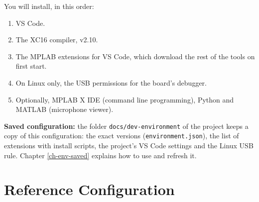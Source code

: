 \documentclass[
  11pt,
  letterpaper,
  oneside,
  DIV=13,               %
  parskip=half,          %
  headings=normal,
  chapterprefix=false,
  toc=listof,
  numbers=noenddot,
]{scrbook}
\begin{document}
You will install, in this order:
\begin{enumerate}
\item VS Code.
\item The XC16 compiler, v2.10.
\item The MPLAB extensions for VS Code, which download the rest of the tools on first start.
\item On Linux only, the USB permissions for the board's debugger.
\item Optionally, MPLAB X IDE (command line programming), Python and MATLAB (microphone viewer).
\end{enumerate}
\begin{notebox}\textbf{Saved configuration:} the folder \texttt{docs/\allowbreak{}dev-\allowbreak{}environment} of the project keeps a copy of this configuration: the exact versions (\texttt{environment.\allowbreak{}json}), the list of extensions with install scripts, the project's VS Code settings and the Linux USB rule. Chapter \ref{ch-env-saved} explains how to use and refresh it.\end{notebox}

\chapter{Reference Configuration}\label{ch-env-config}
\end{document}
